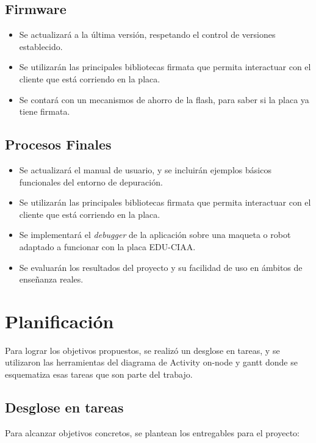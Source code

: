 \subsection{Firmware}

\begin{itemize}
	\item Se actualizará a la última versión, respetando el control de versiones establecido.	
	\item Se utilizarán las principales bibliotecas firmata que permita interactuar con el cliente que está corriendo en la placa.
	\item Se contará con un mecanismos de ahorro de la flash, para saber si la placa ya tiene firmata.
\end{itemize}

\subsection{Procesos Finales}

\begin{itemize}
	\item Se actualizará el manual de usuario, y se incluirán ejemplos básicos funcionales del entorno de depuración.	
	\item Se utilizarán las principales bibliotecas firmata que permita interactuar con el cliente que está corriendo en la placa.
	\item Se implementará el \emph{debugger} de la aplicación sobre una maqueta o robot adaptado a funcionar con la placa EDU-CIAA.
	\item Se evaluarán los resultados del proyecto y su facilidad de uso en ámbitos de enseñanza reales.
\end{itemize}

\section{Planificación}
\label{sec:ejemplo}

Para lograr los objetivos propuestos, se realizó un desglose en tareas, y se utilizaron las herramientas del diagrama de Activity on-node y gantt donde se esquematiza esas tareas que son parte del trabajo.

\subsection{Desglose en tareas} 

Para alcanzar objetivos concretos, se plantean los entregables para el proyecto:

